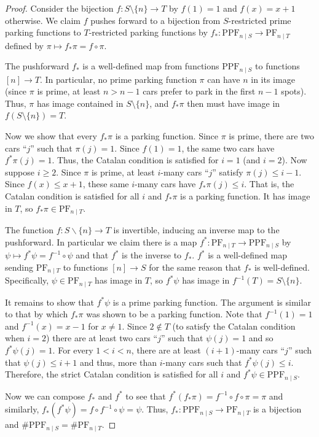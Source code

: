 \documentclass[12 pt]{amsart}
\theoremstyle{definition} %
\theoremstyle{remark} %
\begin{document}
\begin{proof}
	Consider the bijection $f \colon S \setminus \{ n \} \to T$ by $f(1) = 1$ and $f(x) = x + 1$ otherwise. We claim $f$ pushes forward to a bijection from $S$-restricted prime parking functions to $T$-restricted parking functions by $f_{*}\colon\mathrm{PPF}_{n \mid S}\to\mathrm{PF}_{n \mid T}$ defined by $\pi \mapsto f_{*} \pi = f \circ \pi$.

	The pushforward $f_*$ is a well-defined map from functions $\mathrm{PPF}_{n \mid S}$ to functions $[n]\to T$. In particular, no prime parking function $\pi$ can have $n$ in its image (since $\pi$ is prime, at least $n > n - 1$ cars prefer to park in the first $n - 1$ spots). Thus, $\pi$ has image contained in $S \setminus \{ n \}$, and $f_{*} \pi$ then must have image in $f(S \setminus \{ n \}) = T$. 

	Now we show that every $f_{*} \pi$ is a parking function. Since $\pi$ is prime, there are two cars ``$j$'' such that $\pi(j) = 1$. Since $f(1) = 1$, the same two cars have $f^{*} \pi(j) = 1$. Thus, the Catalan condition is satisfied for $i = 1$ (and $i = 2$). Now suppose $i \ge 2$. Since $\pi$ is prime, at least $i$-many cars ``$j$'' satisfy $\pi(j) \le i - 1$. Since $f(x) \le x + 1$, these same $i$-many cars have $f_{*} \pi(j)\le i$. That is, the Catalan condition is satisfied for all $i$ and $f_{*} \pi$ is a parking function. It has image in $T$, so $f_{*} \pi \in \mathrm{PF}_{n\mid T}$.

	The function $f\colon S\backslash\{n\}\to T$ is invertible, inducing an inverse map to the pushforward. In particular we claim there is a map $f^{*} : \mathrm{PF}_{n \mid T} \to \mathrm{PPF}_{n \mid S}$ by $\psi \mapsto f^{*} \psi = f^{-1} \circ \psi$ and that $f^{*}$ is the inverse to $f_{*}$. $f^{*}$ is a well-defined map sending $\mathrm{PF}_{n \mid T}$ to functions $[n] \to S$ for the same reason that $f_{*}$ is well-defined. Specifically, $\psi \in \mathrm{PF}_{n \mid T}$ has image in $T$, so $f^{*} \psi$ has image in $f^{-1}(T) = S \setminus \{ n \}$. 

	It remains to show that $f^{*} \psi$ is a prime parking function. The argument is similar to that by which $f_{*} \pi$ was shown to be a parking function. Note that $f^{-1}(1) = 1$ and $f^{-1}(x) = x - 1$ for $x \neq 1$. Since $2 \not \in T$ (to satisfy the Catalan condition when $i = 2$) there are at least two cars ``$j$'' such that $\psi(j) = 1$ and so $f^{*} \psi(j) = 1$. For every $1 < i < n$, there are at least $(i + 1)$-many cars ``$j$'' such that $\psi(j) \le i + 1$ and thus, more than $i$-many cars such that $f^{*}\psi(j) \le i$. Therefore, the strict Catalan condition is satisfied for all $i$ and $f^{*} \psi \in \mathrm{PPF}_{n\mid S}$.

	Now we can compose $f_{*}$ and $f^{*}$ to see that $f^{*}(f_{*} \pi) = f^{-1} \circ f \circ \pi = \pi$ and similarly, $f_{*}(f^{*} \psi) = f \circ f^{-1} \circ \psi = \psi$. Thus, $f_*:\mathrm{PPF}_{n\mid S}\to\mathrm{PF}_{n\mid T}$ is a bijection and $\# \mathrm{PPF}_{n \mid S} = \# \mathrm{PF}_{n \mid T}$.
\end{proof}
\end{document}
